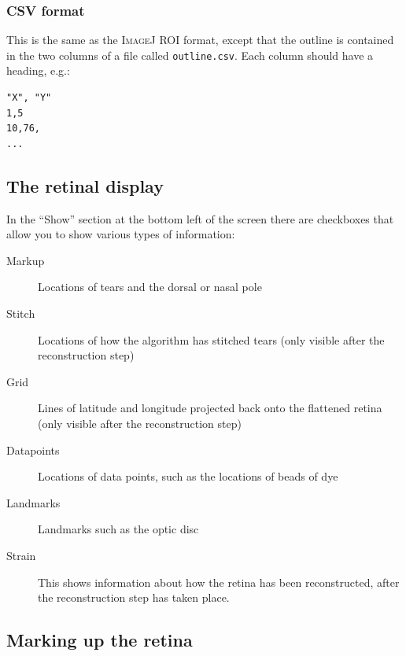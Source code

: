 \documentclass{article}
\begin{document}
\subsubsection{CSV format}
\label{retistruct-manual:sec:csv-format}

This is the same as the \textsc{ImageJ ROI} format, except that the
outline is contained in the two columns of a file called
\texttt{outline.csv}.  Each column should have a heading, e.g.:
\begin{verbatim}
"X", "Y"
1,5
10,76,
...
\end{verbatim}


\subsection{The retinal display}
\label{manual:sec:retinal-display}

In the ``Show'' section at the bottom left of the screen there are
checkboxes that allow you to show various types of information:
\begin{description}
\item[Markup] Locations of tears and the dorsal or nasal pole
\item[Stitch] Locations of how the algorithm has stitched tears (only
  visible after the reconstruction step)
\item[Grid] Lines of latitude and longitude projected back onto the
  flattened retina (only visible after the reconstruction step)
\item[Datapoints] Locations of data points, such as the locations of
  beads of dye
\item[Landmarks] Landmarks such as the optic disc
\item[Strain] This shows information about how the retina has been
  reconstructed, after the reconstruction step has taken place.
\end{description}

\subsection{Marking up the retina}
\label{manual:sec:opening-files-retina}
\end{document}
